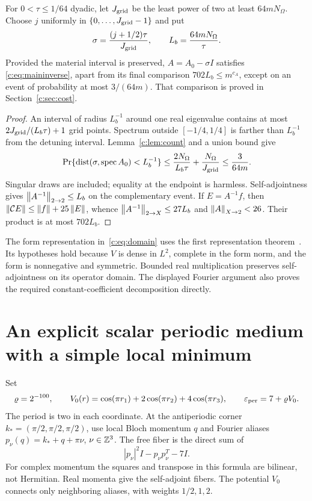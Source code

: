 \begin{lemma}
\label{c:lem:detuning}
For $0<\tau\le1/64$ dyadic, let $J_{\rm grid}$ be the least power of two at least
$64mN_\Omega$. Choose $j$ uniformly in $\{0,\ldots,J_{\rm grid}-1\}$ and put
\begin{equation}
 \sigma=\frac{(j+1/2)\tau}{J_{\rm grid}},\qquad
 L_b=\frac{64mN_\Omega}{\tau}.                         \label{c:eq:detuning}
\end{equation}
Provided the material interval is preserved, $A=A_0-\sigma I$ satisfies
\eqref{c:eq:maininverse}, apart from its final comparison
$702L_b\le m^{c_A}$, except on an event of probability at most
$3/(64m)$. That comparison is proved in Section~\ref{c:sec:cost}.
\end{lemma}
\begin{proof}
An interval of radius $L_b^{-1}$ around one real eigenvalue contains at
most $2J_{\rm grid}/(L_b\tau)+1$ grid points. Spectrum outside $[-1/4,1/4]$ is
farther than $L_b^{-1}$ from the detuning interval. Lemma~\ref{c:lem:count}
and a union bound give
\[
 \Pr\{\operatorname{dist}(\sigma,\operatorname{spec} A_0)<L_b^{-1}\}
 \le\frac{2N_\Omega}{L_b\tau}+\frac{N_\Omega}{J_{\rm grid}}
 \le\frac3{64m}.
\]
Singular draws are included; equality at the endpoint is harmless.
Self-adjointness gives $\left\lVert A^{-1}\right\rVert_{2\to2}\le L_b$ on the
complementary event. If $E=A^{-1}f$, then
$\left\lVert \mathcal C E\right\rVert\le\left\lVert f\right\rVert+25\left\lVert E\right\rVert$, whence
$\left\lVert A^{-1}\right\rVert_{2\to X}\le27L_b$ and
$\left\lVert A\right\rVert_{X\to2}<26$. Their product is at most $702L_b$.
\end{proof}

The form representation in~\eqref{c:eq:domain} uses the first representation
theorem~\citep[Chapter~VI, Section~2, Theorem~2.1]{kato1976}. Its hypotheses
hold because $V$ is dense in $L^2$, complete in the form norm, and the
form is nonnegative and symmetric. Bounded real multiplication preserves
self-adjointness on its operator domain. The displayed Fourier argument
also proves the required constant-coefficient decomposition directly.

\section{An explicit scalar periodic medium with a simple local minimum}
\label{c:sec:edge}

Set
\begin{equation}
 \varrho=2^{-100},\qquad
 V_0(r)=\cos(\pi r_1)+2\cos(\pi r_2)+4\cos(\pi r_3),
 \qquad \varepsilon_{\rm per}=7+\varrho V_0.           \label{c:eq:background}
\end{equation}
The period is two in each coordinate. At the antiperiodic corner
$k_*=(\pi/2,\pi/2,\pi/2)$, use local Bloch momentum $q$ and Fourier
aliases $p_\nu(q)=k_*+q+\pi\nu$, $\nu\in\mathbb Z^3$. The free fiber is the direct
sum of
\begin{equation}
 |p_\nu|^2I-p_\nu p_\nu^T-7I.                                \label{c:eq:freefiber}
\end{equation}
For complex momentum the squares and transpose in this formula are
bilinear, not Hermitian. Real momenta give the self-adjoint fibers.
The potential $V_0$ connects only neighboring aliases, with weights
$1/2,1,2$.

